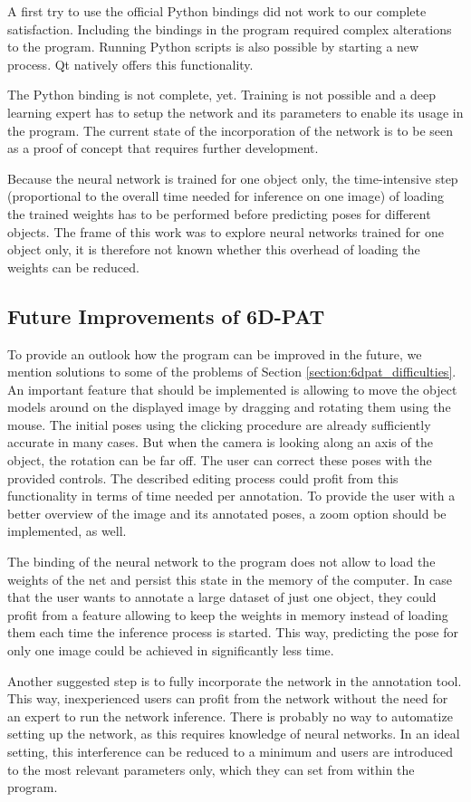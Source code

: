 A first try to use the official Python bindings did not work to our complete satisfaction. Including the bindings in the program required complex alterations to the program. Running Python scripts is also possible by starting a new process. Qt natively offers this functionality.

The Python binding is not complete, yet. Training is not possible and a deep learning expert has to setup the network and its parameters to enable its usage in the program. The current state of the incorporation of the network is to be seen as a proof of concept that requires further development.

Because the neural network is trained for one object only, the time-intensive step (proportional to the overall time needed for inference on one image) of loading the trained weights has to be performed before predicting poses for different objects. The frame of this work was to explore neural networks trained for one object only, it is therefore not known whether this overhead of loading the weights can be reduced.

\subsection{Future Improvements of 6D-PAT}


To provide an outlook how the program can be improved in the future, we mention solutions to some of the problems of Section \ref{section:6dpat_difficulties}. An important feature that should be implemented is allowing to move the object models around on the displayed image by dragging and rotating them using the mouse. The initial poses using the clicking procedure are already sufficiently accurate in many cases. But when the camera is looking along an axis of the object, the rotation can be far off. The user can correct these poses with the provided controls. The described editing process could profit from this functionality in terms of time needed per annotation. To provide the user with a better overview of the image and its annotated poses, a zoom option should be implemented, as well.

The binding of the neural network to the program does not allow to load the weights of the net and persist this state in the memory of the computer. In case that the user wants to annotate a large dataset of just one object, they could profit from a feature allowing to keep the weights in memory instead of loading them each time the inference process is started. This way, predicting the pose for only one image could be achieved in significantly less time.

Another suggested step is to fully incorporate the network in the annotation tool. This way, inexperienced users can profit from the network without the need for an expert to run the network inference. There is probably no way to automatize setting up the network, as this requires knowledge of neural networks. In an ideal setting, this interference can be reduced to a minimum and users are introduced to the most relevant parameters only, which they can set from within the program.